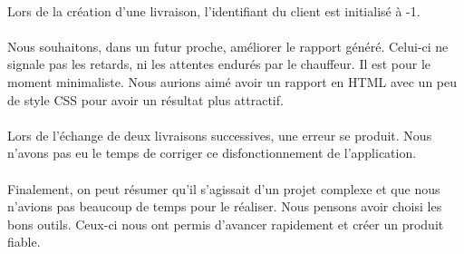 \documentclass[10pt,a4paper]{book}
\begin{document}
\paragraph{}
Lors de la création d'une livraison, l'identifiant du client est initialisé à -1.
\paragraph{}
Nous souhaitons, dans un futur proche, améliorer le rapport généré. Celui-ci ne signale pas les retards, ni les attentes endurés par le chauffeur. Il est pour le moment minimaliste. Nous aurions aimé avoir un rapport en HTML avec un peu de style CSS pour avoir un résultat plus attractif.
\paragraph{}
Lors de l'échange de deux livraisons successives, une erreur se produit. Nous n'avons pas eu le temps de corriger ce disfonctionnement de l'application.

\paragraph{}
Finalement, on peut résumer qu'il s'agissait d'un projet complexe et que nous n'avions pas beaucoup de temps pour le réaliser. Nous pensons avoir choisi les bons outils. Ceux-ci nous ont permis d'avancer rapidement et créer un produit fiable.
\appendix{}
\end{document}
